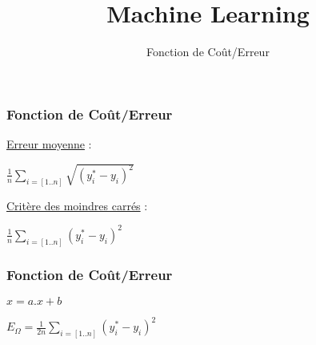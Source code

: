 \documentclass{formation}
\title{Machine Learning}
\subtitle{Fonction de Coût/Erreur}
\begin{document}
\maketitle

\begin{frame}
  \frametitle{Fonction de Coût/Erreur}
  \begin{minipage}[l]{0.40\linewidth}
  \underline{Erreur moyenne} :
  \begin{center}
    $\frac{1}{n}\sum_{i=[1..n]}\sqrt{( y_i^* - y_i )^2}$
    \newline
  \end{center}
  \underline{Critère des moindres carrés} :
  \begin{center}
    $\frac{1}{n}\sum_{i=[1..n]}( y_i^* - y_i )^2$
  \end{center}
  \end{minipage}\hfill
  \begin{minipage}[l]{0.59\linewidth}
  \end{minipage}\hfill
\end{frame}

\begin{frame}
  \frametitle{Fonction de Coût/Erreur}
  \begin{minipage}[l]{0.49\linewidth}
  \begin{center}
    $x = a.x+b$
  \end{center}
  \end{minipage}\hfill
  \begin{minipage}[l]{0.49\linewidth}
  $\boxed{E_\Omega = \frac{1}{2n}\sum_{i=[1..n]}( y_i^* - y_i )^2}$ \\
  \end{minipage}\hfill
\end{frame}
\end{document}
